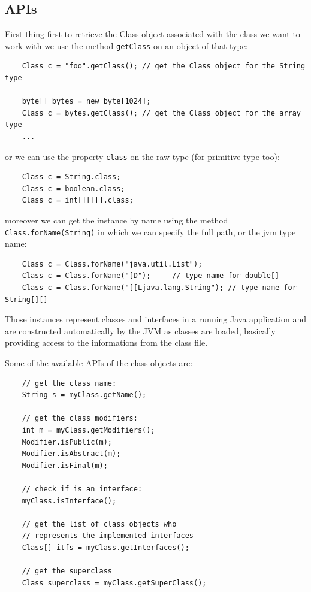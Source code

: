 \subsection{APIs}
First thing first to retrieve the Class object associated with the class we want to work with we use the method \verb|getClass| on an object of that type:
\begin{verbatim}
    Class c = "foo".getClass(); // get the Class object for the String type

    byte[] bytes = new byte[1024];
    Class c = bytes.getClass(); // get the Class object for the array type
    ...
\end{verbatim}
or we can use the property \verb|class| on the raw type (for primitive type too):
\begin{verbatim}
    Class c = String.class;
    Class c = boolean.class;
    Class c = int[][][].class;
\end{verbatim}
moreover we can get the instance by name using the method \verb|Class.forName(String)| in which we can specify the full path, or the jvm type name:
\begin{verbatim}
    Class c = Class.forName("java.util.List");
    Class c = Class.forName("[D");     // type name for double[]
    Class c = Class.forName("[[Ljava.lang.String"); // type name for String[][]
\end{verbatim}

Those instances represent classes and interfaces in a running Java application and are constructed automatically by the JVM as classes are loaded, basically providing access to the informations from the class file.

Some of the available APIs of the class objects are:
\begin{verbatim}
    // get the class name:
    String s = myClass.getName();
    
    // get the class modifiers:
    int m = myClass.getModifiers();
    Modifier.isPublic(m);
    Modifier.isAbstract(m);
    Modifier.isFinal(m);
    
    // check if is an interface:
    myClass.isInterface();
    
    // get the list of class objects who
    // represents the implemented interfaces
    Class[] itfs = myClass.getInterfaces();
    
    // get the superclass
    Class superclass = myClass.getSuperClass();
\end{verbatim}

